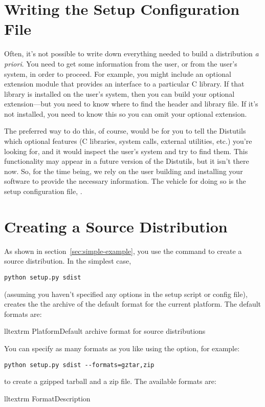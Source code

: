 \documentclass{howto}
\begin{document}
\section{Writing the Setup Configuration File}
\label{sec:setup-config}


Often, it's not possible to write down everything needed to build a
distribution \emph{a priori}.  You need to get some information from the
user, or from the user's system, in order to proceed.  For example, you
might include an optional extension module that provides an interface to
a particular C library.  If that library is installed on the user's
system, then you can build your optional extension---but you need to
know where to find the header and library file.  If it's not installed,
you need to know this so you can omit your optional extension.

The preferred way to do this, of course, would be for you to tell the
Distutils which optional features (C libraries, system calls, external
utilities, etc.) you're looking for, and it would inspect the user's
system and try to find them.  This functionality may appear in a future
version of the Distutils, but it isn't there now.  So, for the time
being, we rely on the user building and installing your software to
provide the necessary information.  The vehicle for doing so is the
setup configuration file, .



\section{Creating a Source Distribution}
\label{sec:source-dist}

As shown in section~\ref{sec:simple-example}, you use the
 command to create a source distribution.  In the
simplest case,
\begin{verbatim}
python setup.py sdist
\end{verbatim}
(assuming you haven't specified any  options in the setup 
script or config file),  creates the the archive of the
default format for the current platform.  The default formats are:
\begin{tableii}{ll}{textrm}%
  {Platform}{Default archive format for source distributions}
\end{tableii}
You can specify as many formats as you like using the  
option, for example:
\begin{verbatim}
python setup.py sdist --formats=gztar,zip
\end{verbatim}
to create a gzipped tarball and a zip file.  The available formats are:
\begin{tableii}{ll}{textrm}%
  {Format}{Description}
\end{tableii}
\end{document}
